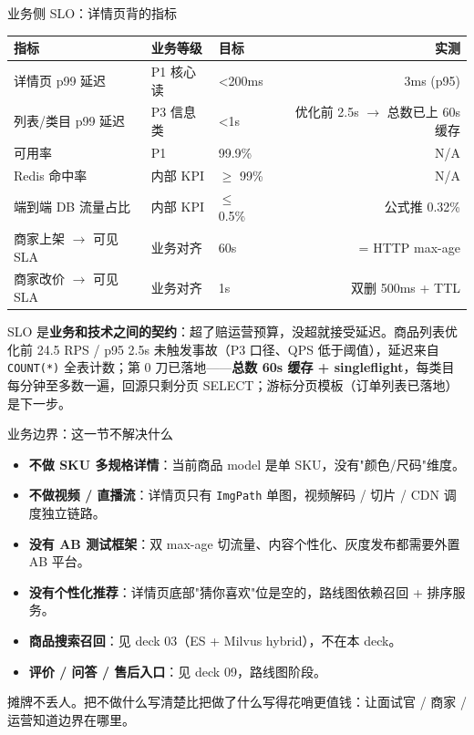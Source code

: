 \documentclass[aspectratio=169,11pt]{beamer}
\begin{document}
\begin{frame}[shrink]{业务侧 SLO：详情页背的指标}
\footnotesize
\begin{tabular}{@{}lllr@{}}
\toprule
指标 & 业务等级 & 目标 & 实测 \\
\midrule
详情页 p99 延迟        & P1 核心读 & \textless 200ms & 3ms (p95) \\
列表/类目 p99 延迟     & P3 信息类 & \textless 1s    & 优化前 2.5s $\to$ 总数已上 60s 缓存 \\
可用率                 & P1        & 99.9\%          & N/A \\
Redis 命中率           & 内部 KPI  & $\ge$ 99\%      & N/A \\
端到端 DB 流量占比     & 内部 KPI  & $\le$ 0.5\%     & 公式推 0.32\% \\
商家上架 $\to$ 可见 SLA & 业务对齐  & 60s             & = HTTP max-age \\
商家改价 $\to$ 可见 SLA & 业务对齐  & 1s              & 双删 500ms + TTL \\
\bottomrule
\end{tabular}
\vspace{2mm}

SLO 是\textbf{业务和技术之间的契约}：超了赔运营预算，没超就接受延迟。商品列表优化前 24.5 RPS / p95 2.5s 未触发事故（P3 口径、QPS 低于阈值），延迟来自 \texttt{COUNT(*)} 全表计数；第 0 刀已落地——\textbf{总数 60s 缓存 + singleflight}，每类目每分钟至多数一遍，回源只剩分页 SELECT；游标分页模板（订单列表已落地）是下一步。
\end{frame}

\begin{frame}[shrink]{业务边界：这一节不解决什么}
\begin{itemize}
  \item \textbf{不做 SKU 多规格详情}：当前商品 model 是单 SKU，没有"颜色/尺码"维度。
  \item \textbf{不做视频 / 直播流}：详情页只有 \texttt{ImgPath} 单图，视频解码 / 切片 / CDN 调度独立链路。
  \item \textbf{没有 AB 测试框架}：双 max-age 切流量、内容个性化、灰度发布都需要外置 AB 平台。
  \item \textbf{没有个性化推荐}：详情页底部"猜你喜欢"位是空的，路线图依赖召回 + 排序服务。
  \item \textbf{商品搜索召回}：见 deck 03（ES + Milvus hybrid），不在本 deck。
  \item \textbf{评价 / 问答 / 售后入口}：见 deck 09，路线图阶段。
\end{itemize}
\vspace{1mm}
\small 摊牌不丢人。把不做什么写清楚比把做了什么写得花哨更值钱：让面试官 / 商家 / 运营知道边界在哪里。
\end{frame}
\end{document}

